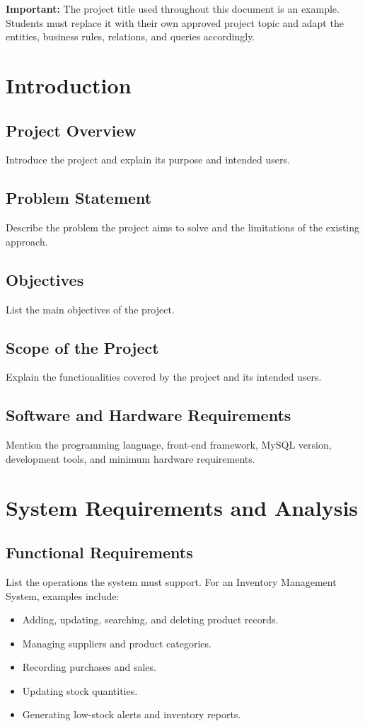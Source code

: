 \documentclass[12pt,a4paper]{report}
\begin{document}
\noindent\textbf{Important:} The project title used throughout this document is an example. Students must replace it with their own approved project topic and adapt the entities, business rules, relations, and queries accordingly.

\chapter{Introduction}

\section{Project Overview}
Introduce the project and explain its purpose and intended users.

\section{Problem Statement}
Describe the problem the project aims to solve and the limitations of the existing approach.

\section{Objectives}
List the main objectives of the project.

\section{Scope of the Project}
Explain the functionalities covered by the project and its intended users.

\section{Software and Hardware Requirements}
Mention the programming language, front-end framework, MySQL version, development tools, and minimum hardware requirements.

\chapter{System Requirements and Analysis}

\section{Functional Requirements}
List the operations the system must support. For an Inventory Management System, examples include:
\begin{itemize}
    \item Adding, updating, searching, and deleting product records.
    \item Managing suppliers and product categories.
    \item Recording purchases and sales.
    \item Updating stock quantities.
    \item Generating low-stock alerts and inventory reports.
\end{itemize}
\end{document}
